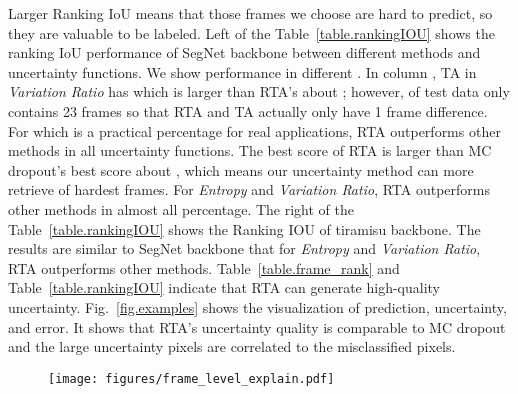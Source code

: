 Larger Ranking IoU means that those frames we choose are hard to predict, so they are valuable to be labeled. Left of the Table~\ref{table.rankingIOU} shows the ranking IoU performance of SegNet backbone between different methods and uncertainty functions. We show performance in different . In column , TA in \textit{Variation Ratio} has  which is larger than RTA's  about ; however,  of test data only contains 23 frames so that RTA and TA actually only have 1 frame difference. For  which is a practical percentage for real applications, RTA outperforms other methods in all uncertainty functions. The best score of RTA  is larger than MC dropout's best score  about , which means our uncertainty method can more retrieve  of hardest frames. For \textit{Entropy} and \textit{Variation Ratio}, RTA outperforms other methods in almost all percentage. The right of the Table~\ref{table.rankingIOU} shows the Ranking IOU of tiramisu backbone. The results are similar to SegNet backbone that for \textit{Entropy} and \textit{Variation Ratio}, RTA outperforms other methods. Table~\ref{table.frame_rank} and Table~\ref{table.rankingIOU} indicate that RTA can generate high-quality uncertainty. Fig.~\ref{fig.examples} shows the visualization of prediction, uncertainty, and error. It shows that RTA's uncertainty quality is comparable to MC dropout and the large uncertainty pixels are correlated to the misclassified pixels. 
\begin{figure}[t]
\begin{center}   
\texttt{[image: figures/frame\_level\_explain.pdf]}
\small \caption{\small {}}

\label{fig.frame_level_explain}
\end{center}
\end{figure}



